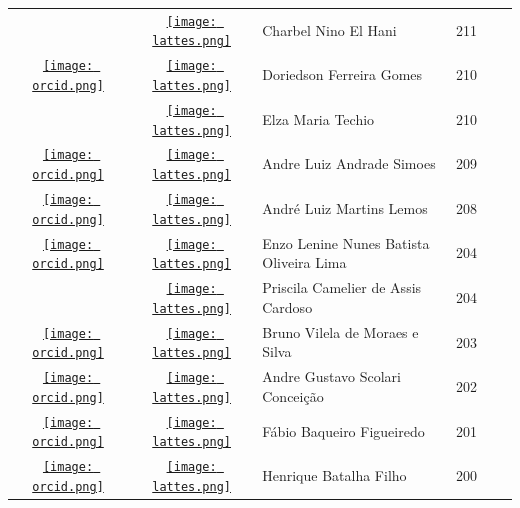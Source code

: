 \documentclass[12pt,brazil]{article}\usepackage[]{graphicx}\usepackage[]{xcolor}
\begin{document}
\begin{longtable}{cclrll}
 & \href{http://lattes.cnpq.br/8022297490892415}{\texttt{[image: lattes.png]}} & Charbel Nino El Hani & 211 &  &  \\

\href{https://orcid.org/0000-0002-1569-8101}{\texttt{[image: orcid.png]}} & \href{http://lattes.cnpq.br/8362416389366966}{\texttt{[image: lattes.png]}} & Doriedson Ferreira Gomes & 210 &  &  \\

 & \href{http://lattes.cnpq.br/5421304500367255}{\texttt{[image: lattes.png]}} & Elza Maria Techio & 210 &  &  \\

\href{https://orcid.org/0000-0001-7784-3290}{\texttt{[image: orcid.png]}} & \href{http://lattes.cnpq.br/4744339230025916}{\texttt{[image: lattes.png]}} & Andre Luiz Andrade Simoes & 209 &  &  \\

\href{https://orcid.org/0000-0001-9291-6494}{\texttt{[image: orcid.png]}} & \href{http://lattes.cnpq.br/5586679333125539}{\texttt{[image: lattes.png]}} & André Luiz Martins Lemos & 208 &  &  \\

\href{https://orcid.org/0000-0001-5280-4252}{\texttt{[image: orcid.png]}} & \href{http://lattes.cnpq.br/5912441748094486}{\texttt{[image: lattes.png]}} & Enzo Lenine Nunes Batista Oliveira Lima & 204 &  &  \\

 & \href{http://lattes.cnpq.br/5822288200392555}{\texttt{[image: lattes.png]}} & Priscila Camelier de Assis Cardoso & 204 &  &  \\

\href{https://orcid.org/0000-0003-4072-0558}{\texttt{[image: orcid.png]}} & \href{http://lattes.cnpq.br/5535116365389028}{\texttt{[image: lattes.png]}} & Bruno Vilela de Moraes e Silva & 203 &  &  \\

\href{https://orcid.org/0000-0001-8124-6253}{\texttt{[image: orcid.png]}} & \href{http://lattes.cnpq.br/6840685961007897}{\texttt{[image: lattes.png]}} & Andre Gustavo Scolari Conceição & 202 &  &  \\

\href{https://orcid.org/0000-0002-6418-8036}{\texttt{[image: orcid.png]}} & \href{http://lattes.cnpq.br/1806117156597780}{\texttt{[image: lattes.png]}} & Fábio Baqueiro Figueiredo & 201 &  &  \\

\href{https://orcid.org/0000-0001-7191-2814}{\texttt{[image: orcid.png]}} & \href{http://lattes.cnpq.br/1967904095420961}{\texttt{[image: lattes.png]}} & Henrique Batalha Filho & 200 &  &  \\


\end{longtable}
\end{document}
